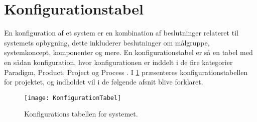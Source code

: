 \section{Konfigurationstabel}\label{konfigurationstabel}
En konfiguration af et system er en kombination af beslutninger relateret til systemets opbygning, dette inkluderer beslutninger om målgruppe, systemkoncept, komponenter og mere.
En konfigurationstabel er så en tabel med en sådan konfiguration, hvor konfigurationen er inddelt i de fire kategorier Paradigm, Product, Project og Process \citep{art:essence}.
I \cref{tab:konfigurationsTabel} præsenteres konfigurationstabellen for projektet, og indholdet vil i de følgende afsnit blive forklaret.

\begin{figure}
\texttt{[image: KonfigurationTabel]}
\caption{Konfigurations tabellen for systemet.}
\label{tab:konfigurationsTabel}
\end{figure}
